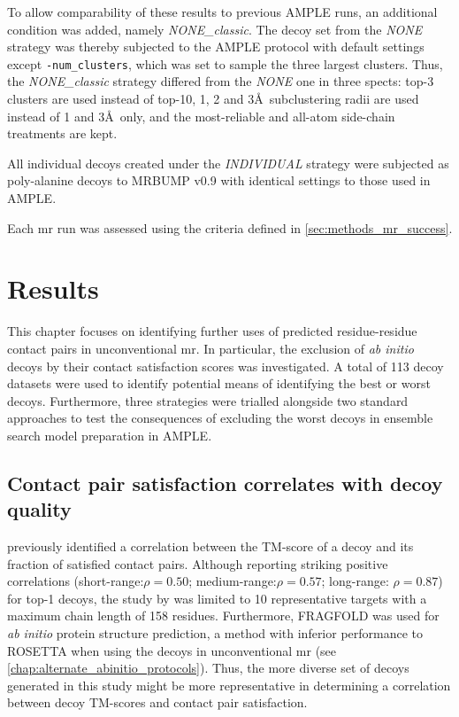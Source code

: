 To allow comparability of these results to previous AMPLE runs, an additional condition was added, namely \textit{NONE\_classic}. The decoy set from the \textit{NONE} strategy was thereby subjected to the AMPLE protocol with default settings except \texttt{-num\_clusters}, which was set to sample the three largest clusters. Thus, the \textit{NONE\_classic} strategy differed from the \textit{NONE} one in three spects: top-3 clusters are used instead of top-10, 1, 2 and 3\AA\ subclustering radii are used instead of 1 and 3\AA\ only, and the most-reliable and all-atom side-chain treatments are kept.

All individual decoys created under the \textit{INDIVIDUAL} strategy were subjected as poly-alanine decoys to MRBUMP v0.9 \cite{Keegan2018-kn} with identical settings to those used in AMPLE. 

Each \gls{mr} run was assessed using the criteria defined in \cref{sec:methods_mr_success}.

\section{Results}
This chapter focuses on identifying further uses of predicted residue-residue contact pairs in unconventional \gls{mr}. In particular, the exclusion of \textit{ab initio} decoys by their contact satisfaction scores was investigated. A total of 113 decoy datasets were used to identify potential means of identifying the best or worst decoys. Furthermore, three strategies were trialled alongside two standard approaches to test the consequences of excluding the worst decoys in ensemble search model preparation in AMPLE.

\subsection{Contact pair satisfaction correlates with decoy quality}
\textcite{Kosciolek2014-bt} previously identified a correlation between the TM-score of a decoy and its fraction of satisfied contact pairs. Although reporting striking positive correlations (short-range:$\rho=0.50$; medium-range:$\rho=0.57$; long-range: $\rho=0.87$) for top-1 decoys, the study by \textcite{Kosciolek2014-bt} was limited to 10 representative targets with a maximum chain length of 158 residues. Furthermore, FRAGFOLD \cite{Jones2001-mc} was used for \textit{ab initio} protein structure prediction, a method with inferior performance to ROSETTA \cite{Rohl2004-dj} when using the decoys in unconventional \gls{mr} (see \cref{chap:alternate_abinitio_protocols}). Thus, the more diverse set of decoys generated in this study might be more representative in determining a correlation between decoy TM-scores and contact pair satisfaction.

